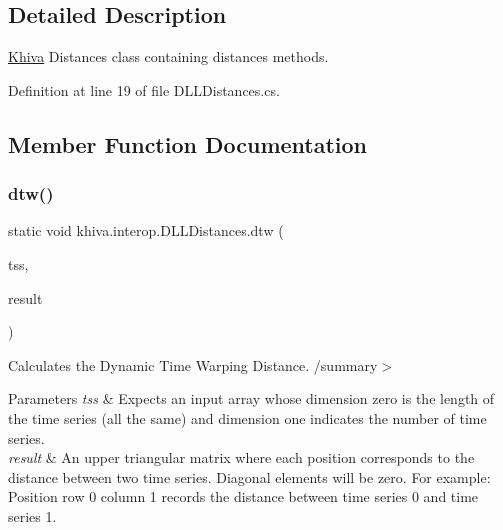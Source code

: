 \subsection{Detailed Description}
\mbox{\hyperlink{classkhiva_1_1_khiva}{Khiva}} Distances class containing distances methods. 



Definition at line 19 of file D\+L\+L\+Distances.\+cs.



\subsection{Member Function Documentation}
\mbox{\label{classkhiva_1_1interop_1_1_d_l_l_distances_a00c1906d6308f864e2034743c6e1c3c6}} 
\subsubsection{\texorpdfstring{dtw()}{dtw()}}
{\footnotesize\ttfamily static void khiva.\+interop.\+D\+L\+L\+Distances.\+dtw (\begin{DoxyParamCaption}\item[{\mbox{[}\+In\mbox{]} ref Int\+Ptr}]{tss,  }\item[{\mbox{[}\+Out\mbox{]} out Int\+Ptr}]{result }\end{DoxyParamCaption})\hspace{0.3cm}{\ttfamily [static]}}



Calculates the Dynamic Time Warping Distance. /summary$>$ 
\begin{DoxyParams}{Parameters}
{\em tss} & Expects an input array whose dimension zero is the length of the time series (all the same) and dimension one indicates the number of time series.\\
\hline
{\em result} & An upper triangular matrix where each position corresponds to the distance between two time series. Diagonal elements will be zero. For example\+: Position row 0 column 1 records the distance between time series 0 and time series 1.\\
\hline
\end{DoxyParams}


\mbox{\label{classkhiva_1_1interop_1_1_d_l_l_distances_aa869f8c6d5c45991db203eaf91dfa918}} 
